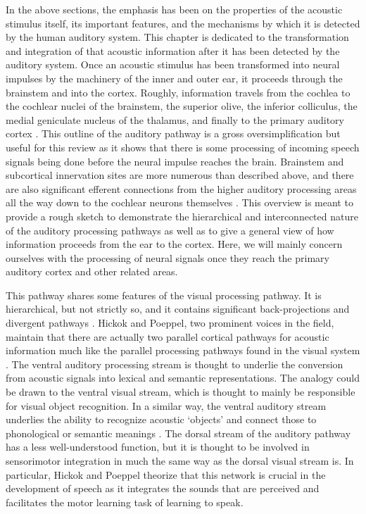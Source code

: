 \documentclass[titlepage]{article}
\begin{document}
  In the above sections, the emphasis has been on the properties of the
  acoustic stimulus itself, its important features, and the mechanisms by
  which it is detected by the human auditory system. This chapter is dedicated
  to the transformation and integration of that acoustic information after it
  has been detected by the auditory system. Once an acoustic stimulus has
  been transformed into neural impulses by the machinery of the inner and outer
  ear, it proceeds through the brainstem and into the cortex. Roughly,
  information travels from the cochlea to the cochlear nuclei of the brainstem,
  the superior olive, the inferior colliculus, the medial geniculate nucleus of
  the thalamus, and finally to the primary auditory cortex
  \cite{Hickok2007,Webster1992}. This outline of the auditory pathway is
  a gross oversimplification but useful for this review as it shows that 
  there is some processing of incoming speech signals being done before the
  neural impulse reaches the brain. Brainstem and subcortical innervation
  sites are more numerous than described above, and there are also significant
  efferent connections from the higher auditory processing areas all the way
  down to the cochlear neurons themselves \cite{Kandel2000,Webster1992}. This
  overview is meant to provide a rough sketch to demonstrate the hierarchical
  and interconnected nature of the auditory processing pathways as well as to
  give a general view of how information proceeds from the ear to the cortex.
  Here, we will mainly concern ourselves with the processing of neural signals
  once they reach the primary auditory cortex and other related areas.


  This pathway shares some features of the visual processing pathway. It is
  hierarchical, but not strictly so, and it contains significant
  back-projections and divergent pathways \cite{Webster1992,Hickok2007}.
  Hickok and Poeppel, two prominent voices in the field, maintain that there
  are actually two parallel cortical pathways for acoustic information much
  like the parallel processing pathways found in the visual system
  \cite{Hickok2007,Hickok2004,Hickok2000}. The ventral auditory processing
  stream is thought to underlie the conversion from acoustic signals into
  lexical and semantic representations. The analogy could be drawn to the
  ventral visual stream, which is thought to mainly be responsible for visual
  object recognition. In a similar way, the ventral auditory stream underlies
  the ability to recognize acoustic `objects' and connect those to phonological
  or semantic meanings \cite{Parker2005,Rauschecker2009}. The dorsal stream of
  the auditory pathway has a less well-understood function, but it is thought
  to be involved in sensorimotor integration in much the same way as the dorsal
  visual stream is. In particular, Hickok and Poeppel theorize that this
  network is crucial in the development of speech as it integrates the sounds
  that are perceived and facilitates the motor learning task of learning to
  speak.
\end{document}
